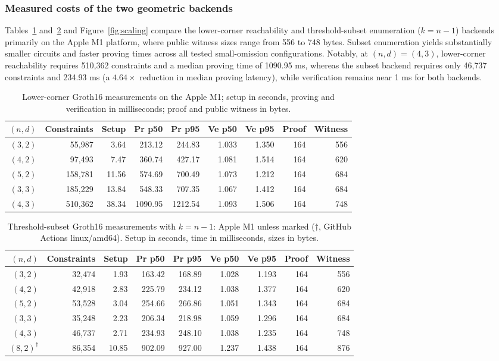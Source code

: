 \documentclass[pdflatex,iicol,sn-mathphys-num]{sn-jnl}
\theoremstyle{thmstyleone}
\begin{document}
\subsubsection{Measured costs of the two geometric backends}
Tables~\ref{tab:crypto} and~\ref{tab:subset} and Figure~\ref{fig:scaling} compare the lower-corner reachability and threshold-subset enumeration ($k = n - 1$) backends primarily on the Apple M1 platform, where public witness sizes range from 556 to 748 bytes. Subset enumeration yields substantially smaller circuits and faster proving times across all tested small-omission configurations. Notably, at $(n, d) = (4, 3)$, lower-corner reachability requires 510,362 constraints and a median proving time of 1090.95 ms, whereas the subset backend requires only 46,737 constraints and 234.93 ms (a $4.64\times$ reduction in median proving latency), while verification remains near 1 ms for both backends.

\begin{table}[t]\centering\scriptsize
\setlength{\tabcolsep}{3pt}
\caption{Lower-corner Groth16 measurements on the Apple M1; setup in seconds, proving and verification in milliseconds; proof and public witness in bytes.}\label{tab:crypto}
\begin{tabular}{rrrrrrrrr}\toprule
$(n,d)$&Constraints&Setup&Pr p50&Pr p95&Ve p50&Ve p95&Proof&Witness\\\midrule
$(3,2)$&55,987&3.64&213.12&244.83&1.033&1.350&164&556\\
$(4,2)$&97,493&7.47&360.74&427.17&1.081&1.514&164&620\\
$(5,2)$&158,781&11.56&574.69&700.49&1.073&1.212&164&684\\
$(3,3)$&185,229&13.84&548.33&707.35&1.067&1.412&164&684\\
$(4,3)$&510,362&38.34&1090.95&1212.54&1.093&1.506&164&748\\\bottomrule
\end{tabular}
\end{table}

\begin{table}[t]\centering\scriptsize
\setlength{\tabcolsep}{3pt}
\caption{Threshold-subset Groth16 measurements with $k=n-1$: Apple M1 unless marked ($\dagger$, GitHub Actions linux/amd64). Setup in seconds, time in milliseconds, sizes in bytes.}\label{tab:subset}
\begin{tabular}{rrrrrrrrr}\toprule
$(n,d)$&Constraints&Setup&Pr p50&Pr p95&Ve p50&Ve p95&Proof&Witness\\\midrule
$(3,2)$&32,474&1.93&163.42&168.89&1.028&1.193&164&556\\
$(4,2)$&42,918&2.83&225.79&234.12&1.038&1.377&164&620\\
$(5,2)$&53,528&3.04&254.66&266.86&1.051&1.343&164&684\\
$(3,3)$&35,248&2.23&206.34&218.98&1.059&1.296&164&684\\
$(4,3)$&46,737&2.71&234.93&248.10&1.038&1.235&164&748\\
$(8,2)^\dagger$&86,354&10.85&902.09&927.00&1.237&1.438&164&876\\\bottomrule
\end{tabular}
\end{table}
\end{document}
